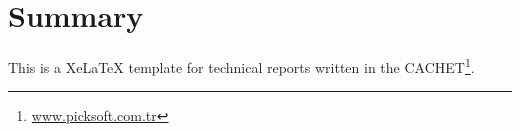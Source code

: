 \chapter{Summary}
This is a XeLaTeX template for technical reports written in the \acf{CACHET}\footnote{\url{www.picksoft.com.tr}}. 